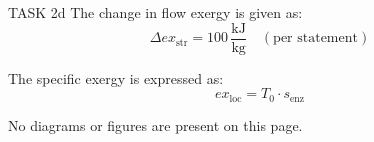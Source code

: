 TASK 2d  
The change in flow exergy is given as:  
\[
\Delta ex_{\text{str}} = 100 \, \frac{\text{kJ}}{\text{kg}} \quad (\text{per statement})
\]  

The specific exergy is expressed as:  
\[
ex_{\text{loc}} = T_0 \cdot s_{\text{enz}}
\]  

No diagrams or figures are present on this page.